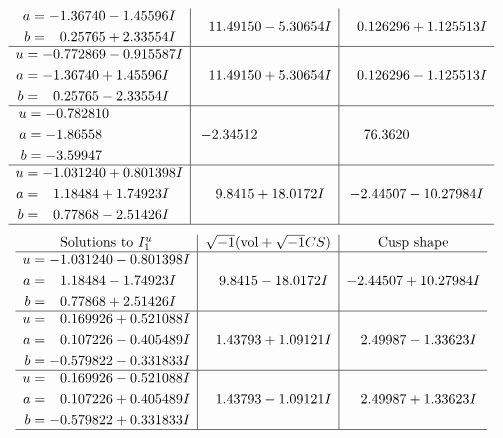 \documentclass[1p]{elsarticle_modified}
\theoremstyle{definition}
\newcommand{\I}{\sqrt{-1}}
\begin{document}
$$\begin{array}{c|c|c}
\begin{aligned}
a &= -1.36740 - 1.45596 I \\
b &= \phantom{-}0.25765 + 2.33554 I\end{aligned}
 & \phantom{-}11.49150 - 5.30654 I & \phantom{-}0.126296 + 1.125513 I \\ \hline\begin{aligned}
u &= -0.772869 - 0.915587 I \\
a &= -1.36740 + 1.45596 I \\
b &= \phantom{-}0.25765 - 2.33554 I\end{aligned}
 & \phantom{-}11.49150 + 5.30654 I & \phantom{-}0.126296 - 1.125513 I \\ \hline\begin{aligned}
u &= -0.782810\phantom{ +0.000000I} \\
a &= -1.86558\phantom{ +0.000000I} \\
b &= -3.59947\phantom{ +0.000000I}\end{aligned}
 & -2.34512\phantom{ +0.000000I} & \phantom{-}76.3620\phantom{ +0.000000I} \\ \hline\begin{aligned}
u &= -1.031240 + 0.801398 I \\
a &= \phantom{-}1.18484 + 1.74923 I \\
b &= \phantom{-}0.77868 - 2.51426 I\end{aligned}
 & \phantom{-}9.8415 + 18.0172 I & -2.44507 - 10.27984 I\\
 \hline 
 \end{array}$$\newpage$$\begin{array}{c|c|c}  
\text{Solutions to }I^u_{1}& \I (\text{vol} + \sqrt{-1}CS) & \text{Cusp shape}\\
 \hline 
\begin{aligned}
u &= -1.031240 - 0.801398 I \\
a &= \phantom{-}1.18484 - 1.74923 I \\
b &= \phantom{-}0.77868 + 2.51426 I\end{aligned}
 & \phantom{-}9.8415 - 18.0172 I & -2.44507 + 10.27984 I \\ \hline\begin{aligned}
u &= \phantom{-}0.169926 + 0.521088 I \\
a &= \phantom{-}0.107226 - 0.405489 I \\
b &= -0.579822 - 0.331833 I\end{aligned}
 & \phantom{-}1.43793 + 1.09121 I & \phantom{-}2.49987 - 1.33623 I \\ \hline\begin{aligned}
u &= \phantom{-}0.169926 - 0.521088 I \\
a &= \phantom{-}0.107226 + 0.405489 I \\
b &= -0.579822 + 0.331833 I\end{aligned}
 & \phantom{-}1.43793 - 1.09121 I & \phantom{-}2.49987 + 1.33623 I\\
 \hline 
 \end{array}$$\newpage\newpage\renewcommand{\arraystretch}{1}
\end{document}
